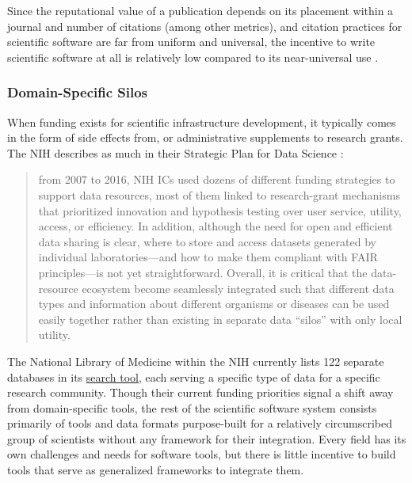 \documentclass[10pt]{article}
\begin{document}
\begin{multicols}{2}
Since the reputational value of a publication depends on its placement
within a journal and number of citations (among other metrics), and
citation practices for scientific software are far from uniform and
universal, the incentive to write scientific software at all is
relatively low compared to its near-universal use \cite{howisonSoftwareScientificLiterature2016} .

\hypertarget{domain-specific-silos}{%
\subsubsection{Domain-Specific Silos}\label{domain-specific-silos}}

When funding exists for scientific infrastructure development, it
typically comes in the form of side effects from, or administrative
supplements to research grants. The NIH describes as much in their
Strategic Plan for Data Science \cite{NIHStrategicPlan2018} :

\begin{quote}
from 2007 to 2016, NIH ICs used dozens of different funding strategies
to support data resources, most of them linked to research-grant
mechanisms that prioritized innovation and hypothesis testing over user
service, utility, access, or efficiency. In addition, although the need
for open and efficient data sharing is clear, where to store and access
datasets generated by individual laboratories---and how to make them
compliant with FAIR principles---is not yet straightforward. Overall, it
is critical that the data-resource ecosystem become seamlessly
integrated such that different data types and information about
different organisms or diseases can be used easily together rather than
existing in separate data ``silos'' with only local utility.
\end{quote}

The National Library of Medicine within the NIH currently lists 122
separate databases in its
\href{https://eresources.nlm.nih.gov/nlm_eresources/}{search tool}, each
serving a specific type of data for a specific research community.
Though their current funding priorities signal a shift away from
domain-specific tools, the rest of the scientific software system
consists primarily of tools and data formats purpose-built for a
relatively circumscribed group of scientists without any framework for
their integration. Every field has its own challenges and needs for
software tools, but there is little incentive to build tools that serve
as generalized frameworks to integrate them.


\end{multicols}
\end{document}

